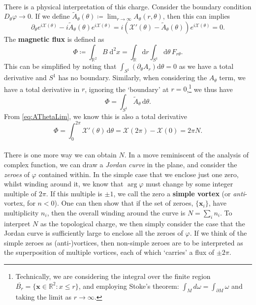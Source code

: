 \documentclass[11pt, fleqn]{article}
\begin{document}
\paragraph{} There is a physical interpretation of this charge. Consider the boundary condition $ D_\theta \varphi \to 0 $. If we define $ \tilde{A}_\theta (\theta) \coloneqq \lim_{r \to \infty} A_\theta(r,\theta) $, then this can implies
	\begin{equation}\label{eq:AThetaLim}
		\partial_\theta e^{i \mathcal{X}(\theta)} - i \tilde{A}_\theta (\theta) e^{i \mathcal{X}(\theta)} = i \left( \mathcal{X}'(\theta) - \tilde{A}_\theta(\theta) \right) e^{i\mathcal{X}(\theta)} = 0.
	\end{equation}
The \textbf{magnetic flux} is defined as
	\begin{equation}\label{key}
		\Phi \coloneqq \int_{\mathbb{R}^2} B \; \mathrm{d}^2x = \int_\mathbb{R} \mathrm{d}r \int_{S^1} \mathrm{d}\theta \, F_{r\theta}.
	\end{equation}
This can be simplified by noting that $ \int_{S^1} \left( \partial_\theta A_r \right) \mathrm{d}\theta = 0 $ as we have a total derivative and $ S^1 $ has no boundary. Similarly, when considering the $ A_\theta $ term, we have a total derivative in $ r $, ignoring the `boundary' at $ r = 0 $,\footnote{Technically, we are considering the integral over the finite region $ \overline{B_r} = \{ \mathbf{x} \in \mathbb{R}^2 : x \leq r \} $, and employing Stoke's theorem: $ \int_M d\omega = \int_{\partial M} \omega $ and taking the limit as $ r \to \infty $. } we thus have
	\begin{equation}\label{key}
		\Phi = \int_{S^1} \tilde{A}_\theta \, \mathrm{d}\theta.
	\end{equation}
From \eqref{eq:AThetaLim}, we know this is also a total derivative
	\begin{equation}\label{key}
		\Phi = \int_0^{2 \pi} \mathcal{X}'(\theta) \, \mathrm{d}\theta = \mathcal{X}(2\pi) - \mathcal{X}(0) = 2 \pi N.
	\end{equation}
	
\paragraph{} There is one more way we can obtain $ N $. In a move reminiscent of the analysis of complex function, we can draw a \textit{Jordan curve} in the plane, and consider the \textit{zeroes} of $ \varphi $ contained within. In the simple case that we enclose just one zero, whilst winding around it, we know that $ \arg \varphi $ must change by some integer multiple of $ 2 \pi $. If this multiple is $ \pm 1 $, we call the zero a \textbf{simple vortex} (or \textit{anti}-vortex, for $ n < 0 $). One can then show that if the set of zeroes, $ \{ \mathbf{x}_i \} $, have multiplicity $ n_i $, then the overall winding around the curve is $ N = \sum_i n_i $. To interpret $ N $ as the topological charge, we then simply consider the case that the Jordan curve is sufficiently large to enclose all the zeroes of $ \varphi $. If we think of the simple zeroes as (anti-)vortices, then non-simple zeroes are to be interpreted as the superposition of multiple vortices, each of which `carries' a flux of $ \pm 2 \pi $.
\end{document}
